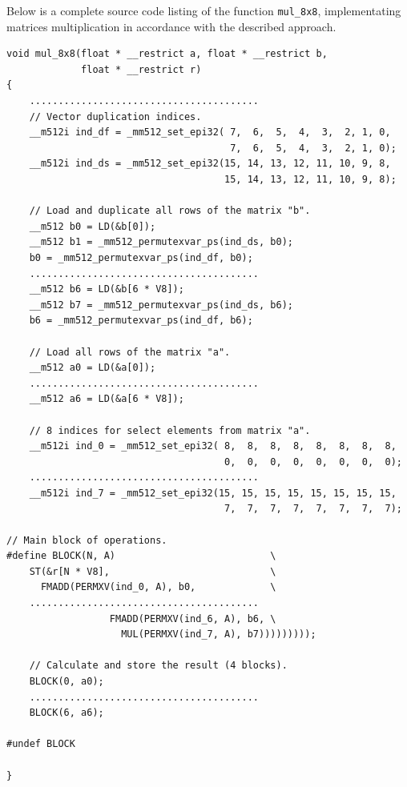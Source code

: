 \documentclass[
11pt,%
tightenlines,%
twoside,%
onecolumn,%
nofloats,%
nobibnotes,%
nofootinbib,%
superscriptaddress,%
noshowpacs,%
centertags]%
{revtex4}
\begin{document}
Below is a complete source code listing of the function \texttt{mul\_8x8}, implementating matrices multiplication in accordance with the described approach.

\begin{lstlisting}
void mul_8x8(float * __restrict a, float * __restrict b,
             float * __restrict r)
{
    ........................................
    // Vector duplication indices.
    __m512i ind_df = _mm512_set_epi32( 7,  6,  5,  4,  3,  2, 1, 0,
                                       7,  6,  5,  4,  3,  2, 1, 0);
    __m512i ind_ds = _mm512_set_epi32(15, 14, 13, 12, 11, 10, 9, 8,
                                      15, 14, 13, 12, 11, 10, 9, 8);

    // Load and duplicate all rows of the matrix "b".
    __m512 b0 = LD(&b[0]);
    __m512 b1 = _mm512_permutexvar_ps(ind_ds, b0);
    b0 = _mm512_permutexvar_ps(ind_df, b0);
    ........................................
    __m512 b6 = LD(&b[6 * V8]);
    __m512 b7 = _mm512_permutexvar_ps(ind_ds, b6);
    b6 = _mm512_permutexvar_ps(ind_df, b6);

    // Load all rows of the matrix "a".
    __m512 a0 = LD(&a[0]);
    ........................................
    __m512 a6 = LD(&a[6 * V8]);

    // 8 indices for select elements from matrix "a".
    __m512i ind_0 = _mm512_set_epi32( 8,  8,  8,  8,  8,  8,  8,  8,
                                      0,  0,  0,  0,  0,  0,  0,  0);
    ........................................
    __m512i ind_7 = _mm512_set_epi32(15, 15, 15, 15, 15, 15, 15, 15,
                                      7,  7,  7,  7,  7,  7,  7,  7);

// Main block of operations.
#define BLOCK(N, A)                           \
    ST(&r[N * V8],                            \
      FMADD(PERMXV(ind_0, A), b0,             \
    ........................................
                  FMADD(PERMXV(ind_6, A), b6, \
                    MUL(PERMXV(ind_7, A), b7)))))))));

    // Calculate and store the result (4 blocks).
    BLOCK(0, a0);
    ........................................
    BLOCK(6, a6);

#undef BLOCK

}
\end{lstlisting}
\end{document}
